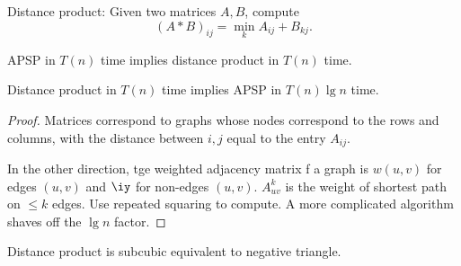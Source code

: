 \begin{prb}
Distance product: Given two matrices $A,B$, compute
\[
(A*B)_{ij} = \min_k A_{ij} + B_{kj}.
\]
\end{prb}
\begin{thm}
APSP in $T(n)$ time implies distance product in $T(n)$ time.

Distance product in $T(n)$ time implies APSP in $T(n)\lg n$ time.
\end{thm}
\begin{proof}
Matrices correspond to graphs whose nodes correspond to the rows and columns, with the distance between $i,j$ equal to the entry $A_{ij}$.

In the other direction, tge weighted adjacency matrix f a graph is $w(u,v)$ for edges $(u,v)$ and $\iy$ for non-edges $(u,v)$. $A^k_{uv}$ is the weight of shortest path on $\le k$ edges. Use repeated squaring to compute.
A more complicated algorithm shaves off the $\lg n$ factor.
\end{proof}

\begin{thm}[VW10]
Distance product is subcubic equivalent to negative triangle.
\end{thm}

